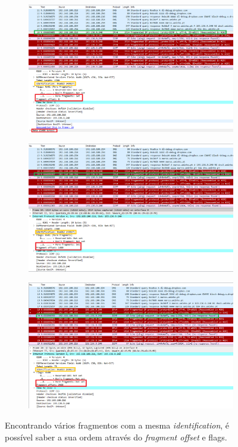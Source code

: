 \documentclass{llncs}
\begin{document}
\begin{figure}[h]
	\centering
	\begin{subfigure}{.4\textwidth}
		\centering
		\includegraphics[width=0.98\linewidth]{./imagens/packet_first.png}
	\end{subfigure}%
	\begin{subfigure}{.4\textwidth}
		\centering
		\includegraphics[width=0.98\linewidth]{./imagens/packet_second.png}
	\end{subfigure}%
	\begin{subfigure}{.4\textwidth}
		\centering
		\includegraphics[width=0.98\linewidth]{./imagens/packet_third.png}
	\end{subfigure}
	\caption{Encontrando vários fragmentos com a mesma \textit{identification}, é possível saber a sua ordem através do \textit{fragment offset} e flags.}
	\label{fig:field_packet}
\end{figure}
\end{document}
